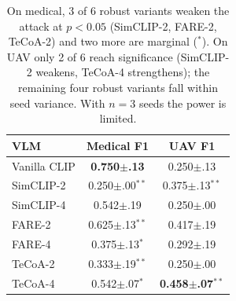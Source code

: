 \documentclass[11pt]{article}
\begin{document}
\begin{table}[h]
\centering
\small
\setlength{\tabcolsep}{4pt}
\begin{tabular}{lcc}
\toprule
VLM & Medical F1 & UAV F1 \\
\midrule
Vanilla CLIP   & \textbf{0.750$\pm$.13} & 0.250$\pm$.13 \\
SimCLIP-2 & 0.250$\pm$.00$^{**}$ & 0.375$\pm$.13$^{**}$ \\
SimCLIP-4 & 0.542$\pm$.19 & 0.250$\pm$.00 \\
FARE-2    & 0.625$\pm$.13$^{**}$ & 0.417$\pm$.19 \\
FARE-4    & 0.375$\pm$.13$^{*}$  & 0.292$\pm$.19 \\
TeCoA-2   & 0.333$\pm$.19$^{**}$ & 0.250$\pm$.00 \\
TeCoA-4   & 0.542$\pm$.07$^{*}$  & \textbf{0.458$\pm$.07}$^{**}$ \\
\bottomrule
\end{tabular}
\caption{On medical, 3 of 6 robust variants weaken the attack at $p\!<\!0.05$ (SimCLIP-2, FARE-2, TeCoA-2) and two more are marginal ($^{*}$). On UAV only 2 of 6 reach significance (SimCLIP-2 weakens, TeCoA-4 strengthens); the remaining four robust variants fall within seed variance. With $n{=}3$ seeds the power is limited.}
\label{tab:vlm_endtoend}
\end{table}
\end{document}
